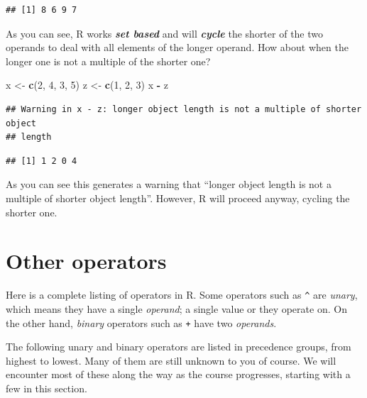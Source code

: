 \documentclass[]{book}
\newenvironment{Shaded}{\begin{snugshade}}{\end{snugshade}}
\newcommand{\DecValTok}[1]{\textcolor[rgb]{0.00,0.00,0.81}{#1}}
\newcommand{\KeywordTok}[1]{\textcolor[rgb]{0.13,0.29,0.53}{\textbf{#1}}}
\newcommand{\NormalTok}[1]{#1}
\newcommand{\OperatorTok}[1]{\textcolor[rgb]{0.81,0.36,0.00}{\textbf{#1}}}
\newcommand{\StringTok}[1]{\textcolor[rgb]{0.31,0.60,0.02}{#1}}
\begin{document}
\begin{verbatim}
## [1] 8 6 9 7
\end{verbatim}

As you can see, R works \textbf{\emph{set based}} and will \textbf{\emph{cycle}} the shorter of the two operands to deal with all elements of the longer operand. How about when the longer one is not a multiple of the shorter one?

\begin{Shaded}
\begin{Highlighting}[]
\NormalTok{x <-}\StringTok{ }\KeywordTok{c}\NormalTok{(}\DecValTok{2}\NormalTok{, }\DecValTok{4}\NormalTok{, }\DecValTok{3}\NormalTok{, }\DecValTok{5}\NormalTok{)}
\NormalTok{z <-}\StringTok{ }\KeywordTok{c}\NormalTok{(}\DecValTok{1}\NormalTok{, }\DecValTok{2}\NormalTok{, }\DecValTok{3}\NormalTok{)}
\NormalTok{x }\OperatorTok{-}\StringTok{ }\NormalTok{z}
\end{Highlighting}
\end{Shaded}

\begin{verbatim}
## Warning in x - z: longer object length is not a multiple of shorter object
## length
\end{verbatim}

\begin{verbatim}
## [1] 1 2 0 4
\end{verbatim}

As you can see this generates a warning that ``longer object length is not a multiple of shorter object length''. However, R will proceed anyway, cycling the shorter one.

\hypertarget{other-operators}{%
\section{Other operators}\label{other-operators}}

Here is a complete listing of operators in R. Some operators such as \texttt{\^{}} are \emph{unary}, which means they have a single \emph{operand}; a single value or they operate on. On the other hand, \emph{binary} operators such as \texttt{+} have two \emph{operands}.

The following unary and binary operators are listed in precedence groups, from highest to lowest. Many of them are still unknown to you of course. We will encounter most of these along the way as the course progresses, starting with a few in this section.
\end{document}
